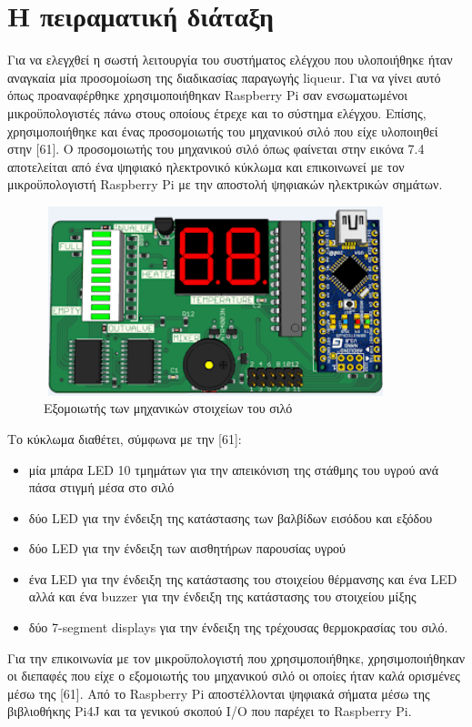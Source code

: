 \newpage
\section{Η πειραματική διάταξη}
Για να ελεγχθεί η σωστή λειτουργία του συστήματος ελέγχου που υλοποιήθηκε ήταν αναγκαία μία προσομοίωση της διαδικασίας παραγωγής liqueur. Για να γίνει αυτό όπως προαναφέρθηκε χρησιμοποιήθηκαν Raspberry Pi σαν ενσωματωμένοι μικροϋπολογιστές πάνω στους οποίους έτρεχε και το σύστημα ελέγχου. Επίσης, χρησιμοποιήθηκε και ένας προσομοιωτής του μηχανικού σιλό που είχε υλοποιηθεί στην [61]. Ο προσομοιωτής του μηχανικού σιλό όπως φαίνεται στην εικόνα 7.4 αποτελείται από ένα ψηφιακό ηλεκτρονικό κύκλωμα και επικοινωνεί με τον μικροϋπολογιστή Raspberry Pi με την αποστολή ψηφιακών ηλεκτρικών σημάτων.

	
\begin{figure}[htbp]
	\centering
		\includegraphics[height=5.5cm,width=10cm]{Figures/24.png}
	\caption{Εξομοιωτής των μηχανικών στοιχείων του σιλό \cite{Foivos}}	
\end{figure}

Το κύκλωμα διαθέτει, σύμφωνα με την [61]:
\begin{itemize}
	\item{μία μπάρα LED 10 τμημάτων για την απεικόνιση της στάθμης του υγρού ανά πάσα στιγμή μέσα στο σιλό}
	\item{δύο LED για την ένδειξη της κατάστασης των βαλβίδων εισόδου και εξόδου}
	\item{δύο LED για την ένδειξη των αισθητήρων παρουσίας υγρού}
	\item{ένα LED για την ένδειξη της κατάστασης του στοιχείου θέρμανσης και ένα LED αλλά και ένα buzzer για την ένδειξη της κατάστασης του στοιχείου μίξης}
	\item{δύο 7-segment displays για την ένδειξη της τρέχουσας θερμοκρασίας του σιλό. }
\end{itemize}

Για την επικοινωνία με τον μικροϋπολογιστή που χρησιμοποιήθηκε, χρησιμοποιήθηκαν οι διεπαφές που είχε ο εξομοιωτής του μηχανικού σιλό οι οποίες ήταν καλά ορισμένες μέσω της [61]. Από το Raspberry Pi αποστέλλονται ψηφιακά σήματα μέσω της βιβλιοθήκης Pi4J και τα γενικού σκοπού Ι/Ο που παρέχει το Raspberry Pi. 

